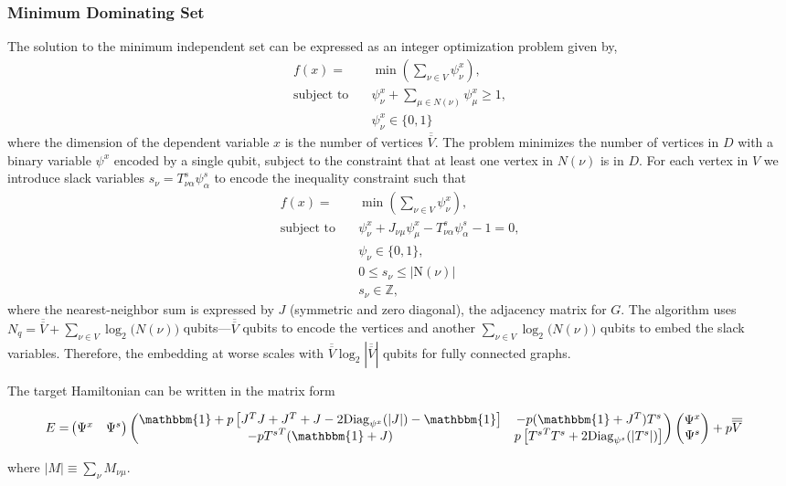 \documentclass[prd,twocolumn,tightenlines,preprintnumbers,showpacs,superscriptaddress,notitlepage,nofootinbib,eqsecnum,floatfix,longbibliography]{revtex4}
\begin{document}
\subsubsection{Minimum Dominating Set}
The solution to the minimum independent set can be expressed as an integer optimization problem given by,
\begin{align}
    f(x) = &\min\left(\sum_{\nu \in V} \psi^x_{\nu}\right),\\
    \textrm{subject to} \quad & \psi^x_{\nu} + \sum_{\mu \in \mathit{N}(\nu)} \psi^x_{\mu} \geq 1,\\
    & \psi^x_{\nu} \in \{0, 1\}
\end{align}
where the dimension of the dependent variable $x$ is the number of vertices $\overline{\overline{V}}$.
The problem minimizes the number of vertices in $D$ with a binary variable $\psi^x$ encoded by a single qubit, subject to the constraint that at least one vertex in $\mathit{N}(\nu)$ is in $D$.
For each vertex in $V$ we introduce slack variables $s_{\nu} = T^s_{\nu \alpha} \psi^s_{\alpha}$ to encode the inequality constraint such that
\begin{align}
    f(x) = &\min(\sum_{\nu\in V} \psi^x_{\nu}),\\
    \textrm{subject to} \quad & \psi^x_{\nu} + J_{\nu \mu} \psi^x_{\mu}- T^s_{\nu \alpha} \psi^s_{\alpha}  - 1 = 0,\\
    & \psi_{\nu} \in \{0, 1\},\\
    & 0 \leq s_{\nu} \leq |\mathrm{N}(\nu)|\\
    & s_{\nu} \in \mathbb{Z},
\end{align}
where the nearest-neighbor sum is expressed by $J$ (symmetric and zero diagonal), the adjacency matrix for $G$.
The algorithm uses $N_q = \overline{\overline{V}} + \sum_{\nu \in V} \log_2 \mathit(N(\nu))$ qubits---$\overline{\overline{V}}$ qubits to encode the vertices and another $\sum_{\nu \in V} \log_2 \mathit(N(\nu))$ qubits to embed the slack variables.
Therefore, the embedding at worse scales with $\overline{\overline{V}} \log_2 |\overline{\overline{V}}|$ qubits for fully connected graphs.

The target Hamiltonian can be written in the matrix form
\begin{widetext}
\begin{align}
    E = &
    \begin{pmatrix}
    \Psi^x & \Psi^s
    \end{pmatrix}
    \begin{pmatrix}
    \mathbbm{1} + p\left[J^T J + J^T + J - 2 \mathrm{Diag}_{\psi^x}(|J|) - \mathbbm{1} \right] & - p(\mathbbm{1}+J^T)T^s\\
    - p{T^s}^T(\mathbbm{1}+J)& p\left[{T^s}^T T^s + 2\mathrm{Diag}_{\psi^s}(|T^s|)\right]
    \end{pmatrix}
    \begin{pmatrix}
    \Psi^x\\ \Psi^s
    \end{pmatrix} + p \overline{\overline{V}}
    \label{eq:matrix_form}
\end{align}
\end{widetext}
where $ |M| \equiv \sum_{\nu} M_{\nu \mu}$.
\end{document}
